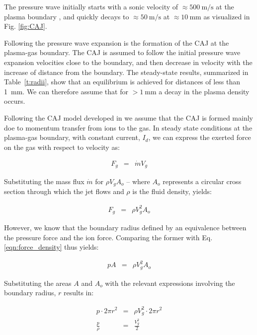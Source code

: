\documentclass[a4paper]{iacas}%
\begin{document}
The pressure wave initially starts with a sonic velocity of $\approx 500~\mathrm{m/s}$ at the plasma boundary \cite{KRClose}, and quickly decays to $\approx 50~\mathrm{m/s}$ \cite{KR,KRFar} at $\approx 10~\mathrm{mm}$ as visualized in Fig. \ref{fig:CAJ}.

Following the pressure wave expansion is the formation of the CAJ at the plasma-gas boundary. The CAJ is assumed to follow the initial pressure wave expansion velocities close to the boundary, and then decrease in velocity with the increase of distance from the boundary. The steady-state results, summarized in Table~\ref{t:radii}, show that an equilibrium is achieved for distances of less than 1~mm. We can therefore assume that for $> 1~\mathrm{mm}$ a decay in the plasma density occurs.

Following the CAJ model developed in \cite{KRClose} we assume that the CAJ is formed mainly doe to momentum transfer from ions to the gas. In steady state conditions at the plasma-gas boundary, with constant current, $I_d$, we can express the exerted force on the gas with respect to velocity as:

\begin{eqnarray}\label{eqn:force_mass_flux}
	F_g &=& \dot{m} V_g
\end{eqnarray}

Substituting the mass flux $\dot{m}$ for $\rho V_g A_{o}$ -- where $A_{o}$ represents a circular cross section through which the jet flows and $\rho$ is the fluid density, yields:

\begin{eqnarray}\label{eqn:force_density}
F_g &=& \rho V^2_g A_{o}
\end{eqnarray}

However, we know that the boundary radius defined by an equivalence between the pressure force and the ion force. Comparing the former with 
Eq. \eqref{eqn:force_density} thus yields:

\begin{eqnarray}\label{eqn:force_gas_equal}
p A &=& \rho V^2_g A_{o}
\end{eqnarray}

Substituting the areas $A$ and $A_o$ with the relevant expressions involving the boundary radius, $r$ results in: 

\begin{eqnarray}\label{eqn:force_gas_ratio}
p \cdot 2\pi r^2 &=& \rho V^2_g \cdot 2\pi r^2 \\
\frac{p}{\rho} &=& \frac{V^2_g}{2}
\end{eqnarray}
\end{document}
